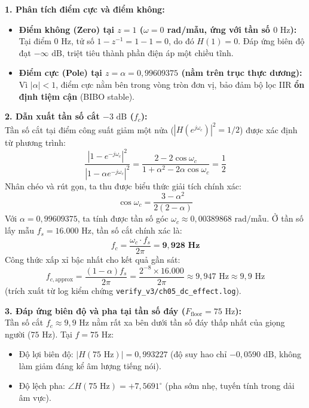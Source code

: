 \textbf{1. Phân tích điểm cực và điểm không:}
\begin{itemize}[leftmargin=1.5em, itemsep=2pt]
    \item \textbf{Điểm không (Zero) tại $z = 1$ ($\omega = 0$ rad/mẫu, ứng với tần số $0\text{ Hz}$):}\\
    Tại điểm $0\text{ Hz}$, tử số $1 - z^{-1} = 1 - 1 = 0$, do đó $H(1) = 0$. Đáp ứng biên độ đạt $-\infty\text{ dB}$, triệt tiêu thành phần điện áp một chiều tĩnh.
    \item \textbf{Điểm cực (Pole) tại $z = \alpha = 0{,}99609375$ (nằm trên trục thực dương):}\\
    Vì $|\alpha| < 1$, điểm cực nằm bên trong vòng tròn đơn vị, bảo đảm bộ lọc IIR \textbf{ổn định tiệm cận} (BIBO stable).
\end{itemize}

\textbf{2. Dẫn xuất tần số cắt $-3\text{ dB}$ ($f_c$):}\\
Tần số cắt tại điểm công suất giảm một nửa ($|H(e^{j\omega_c})|^2 = 1/2$) được xác định từ phương trình:
\begin{equation}
\frac{|1 - e^{-j\omega_c}|^2}{|1 - \alpha e^{-j\omega_c}|^2} = \frac{2 - 2\cos\omega_c}{1 + \alpha^2 - 2\alpha\cos\omega_c} = \frac{1}{2}
\end{equation}
Nhân chéo và rút gọn, ta thu được biểu thức giải tích chính xác:
\begin{equation}
\cos\omega_c = \frac{3 - \alpha^2}{2(2 - \alpha)}
\end{equation}
Với $\alpha = 0{,}99609375$, ta tính được tần số góc $\omega_c \approx 0{,}00389868\text{ rad/mẫu}$. Ở tần số lấy mẫu $f_s = 16.000\text{ Hz}$, tần số cắt chính xác là:
\begin{equation}
f_c = \frac{\omega_c \cdot f_s}{2\pi} = \mathbf{9{,}928\text{ Hz}}
\end{equation}
Công thức xấp xỉ bậc nhất cho kết quả gần sát:
\begin{equation}
f_{c,\text{approx}} = \frac{(1-\alpha)f_s}{2\pi} = \frac{2^{-8} \times 16.000}{2\pi} \approx 9{,}947\text{ Hz} \approx 9{,}9\text{ Hz}
\end{equation}
(trích xuất từ log kiểm chứng \texttt{verify\_v3/ch05\_dc\_effect.log}).

\textbf{3. Đáp ứng biên độ và pha tại tần số đáy ($F_{\text{floor}} = 75\text{ Hz}$):}\\
Tần số cắt $f_c \approx 9{,}9\text{ Hz}$ nằm rất xa bên dưới tần số đáy thấp nhất của giọng người ($75\text{ Hz}$). Tại $f = 75\text{ Hz}$:
\begin{itemize}[leftmargin=1.5em, itemsep=2pt]
    \item Độ lợi biên độ: $|H(75\text{ Hz})| = 0{,}993227$ (độ suy hao chỉ \textbf{$-0{,}0590\text{ dB}$}, không làm giảm đáng kể âm lượng tiếng nói).
    \item Độ lệch pha: $\angle H(75\text{ Hz}) = +7{,}5691^\circ$ (pha sớm nhẹ, tuyến tính trong dải âm vực).
\end{itemize}

